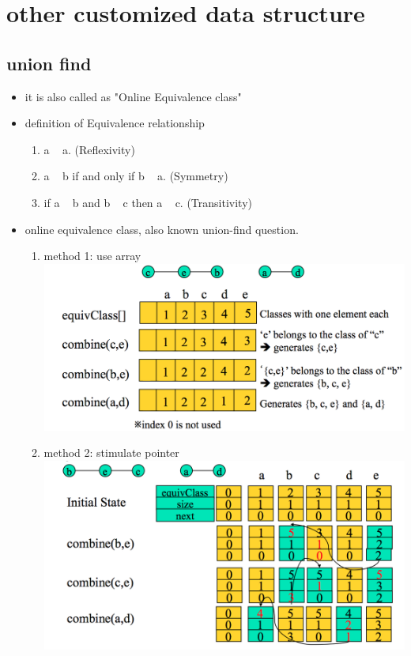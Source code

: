 \documentclass[a4paper,11pt,twoside]{book}
\begin{document}
\section{other customized data structure}

\subsection{union find}

\begin{itemize}
	\item it is also called as "Online Equivalence class"
	
	\item definition of Equivalence relationship
	\begin{enumerate}
		\item a ~ a. (Reflexivity)
		\item a ~ b if and only if b ~ a. (Symmetry)
		\item if a ~ b and b ~ c then a ~ c. (Transitivity)
	\end{enumerate}
	
	\item online equivalence class, also known union-find question.  
	\begin{enumerate}
		\item method 1: use array  \newline 
		\includegraphics[scale=0.55]{pics/online_1.png} 
		
		\item method 2: stimulate pointer \newline 
		\includegraphics[scale=0.55]{pics/online_2.png}  
	\end{enumerate}
	
\end{itemize}
	
\end{document}
